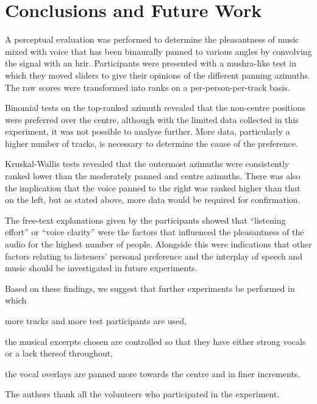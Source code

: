 \documentclass[a4paper,10pt]{edpsci} %
\begin{document}
\section{Conclusions and Future Work}
\label{Conclusions}
A perceptual evaluation was performed to determine the pleasantness of music mixed with voice that has been binaurally panned to various angles by convolving the signal with an \gls{hrir}. Participants were presented with a \gls{mushra}-like test in which they moved sliders to give their opinions of the different panning azimuths. The raw scores were transformed into ranks on a per-person-per-track basis.

Binomial tests on the top-ranked azimuth revealed that the non-centre positions were preferred over the centre, although with the limited data collected in this experiment, it was not possible to analyse further. More data, particularly a higher number of tracks, is necessary to determine the cause of the preference.

Kruskal-Wallis tests revealed that the outermost azimuths were consistently ranked lower than the moderately panned and centre azimuths. There was also the implication that the voice panned to the right was ranked higher than that on the left, but as stated above, more data would be required for confirmation.

The free-text explanations given by the participants showed that \enquote{listening effort} or \enquote{voice clarity} were the factors that influenced the pleasantness of the audio for the highest number of people. Alongside this were indications that other factors relating to listeners' personal preference and the interplay of speech and music should be investigated in future experiments.

Based on these findings, we suggest that further experiments be performed in which 
\begin{enumerate*}
    \item more tracks and more test participants are used,
    \item the musical excerpts chosen are controlled so that they have either strong vocals or a lack thereof throughout,
    \item the vocal overlays are panned more towards the centre and in finer increments.
\end{enumerate*}


\acknowtext

The authors thank all the volunteers who participated in the experiment.
\end{document}
